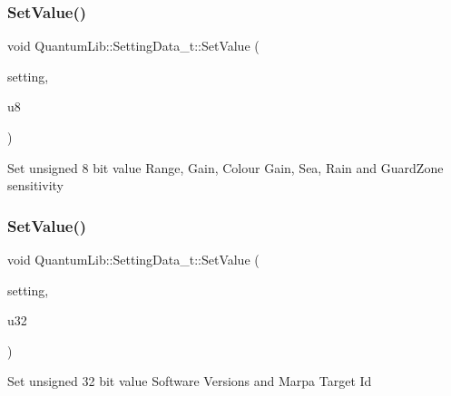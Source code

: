 \subsubsection{\texorpdfstring{Set\+Value()}{SetValue()}\hspace{0.1cm}{\footnotesize\ttfamily [3/26]}}
{\footnotesize\ttfamily void Quantum\+Lib\+::\+Setting\+Data\+\_\+t\+::\+Set\+Value (\begin{DoxyParamCaption}\item[{\mbox{\hyperlink{namespace_quantum_lib_acc8124e3e65bca4aa798d03a55e3d54c}{e\+Settings\+\_\+t}}}]{setting,  }\item[{uint8\+\_\+t}]{u8 }\end{DoxyParamCaption})\hspace{0.3cm}{\ttfamily [inline]}}

Set unsigned 8 bit value Range, Gain, Colour Gain, Sea, Rain and Guard\+Zone sensitivity \mbox{\label{struct_quantum_lib_1_1_setting_data__t_ab5d367111ee227a0072f1264b417b3e4}} 
\subsubsection{\texorpdfstring{Set\+Value()}{SetValue()}\hspace{0.1cm}{\footnotesize\ttfamily [4/26]}}
{\footnotesize\ttfamily void Quantum\+Lib\+::\+Setting\+Data\+\_\+t\+::\+Set\+Value (\begin{DoxyParamCaption}\item[{\mbox{\hyperlink{namespace_quantum_lib_acc8124e3e65bca4aa798d03a55e3d54c}{e\+Settings\+\_\+t}}}]{setting,  }\item[{uint32\+\_\+t}]{u32 }\end{DoxyParamCaption})\hspace{0.3cm}{\ttfamily [inline]}}

Set unsigned 32 bit value Software Versions and Marpa Target Id \mbox{\label{struct_quantum_lib_1_1_setting_data__t_a9529e7b3d4d53a3496017a36ccbd8474}} 
